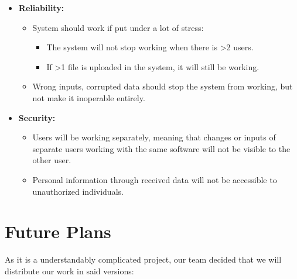 \documentclass[a4paper,12pt,fleqn]{article}
\begin{document}
\begin{itemize}
    \item \textbf{Reliability:}
    \begin{itemize}
        \item System should work if put under a lot of stress:
        \begin{itemize}
            \item The system will not stop working when there is >2 users. 
            \item If >1 file is uploaded in the system, it will still be working. 
        \end{itemize}
        
        \item Wrong inputs, corrupted data should stop the system from working, but not make it inoperable entirely.
    \end{itemize}
    
    \item \textbf{Security:}
    \begin{itemize}
        \item Users will be working separately, meaning that changes or inputs of separate users working with the same software will not be visible to the other user. 
        \item Personal information through received data will not be accessible to unauthorized individuals. 
    \end{itemize}
\end{itemize}

\newpage
\section{Future Plans}
As it is a understandably complicated project, our team decided that we will distribute our work in said versions: 
\end{document}
